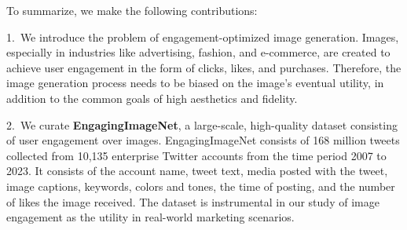  
 
 
 
 
 \noindent To summarize, we make the following contributions:
 
 1.~We introduce the problem of engagement-optimized image generation. Images, especially in industries like advertising, fashion, and e-commerce, are created to achieve user engagement in the form of clicks, likes, and purchases. Therefore, the image generation process needs to be biased on the image's eventual utility, in addition to the common goals of high aesthetics and fidelity. 
 
 
 2.~We curate \textbf{EngagingImageNet}, a large-scale, high-quality dataset consisting of user engagement over images. EngagingImageNet consists of 168 million tweets collected from 10,135 enterprise Twitter accounts from the time period 2007 to 2023. It consists of the account name, tweet text, media posted with the tweet, image captions, keywords, colors and tones, the time of posting, and the number of likes the image received. The dataset is instrumental in our study of image engagement as the utility in real-world marketing scenarios.
 
